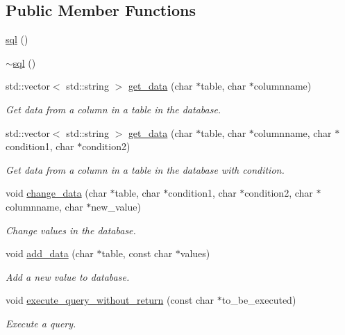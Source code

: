 \subsection*{Public Member Functions}
\begin{DoxyCompactItemize}
\item 
\hyperlink{classsql_ac9b186df2a51d7eda72cd4a9c34c0624}{sql} ()
\item 
\hyperlink{classsql_a67805540e55f3cfb1849178023aa39b2}{$\sim$sql} ()
\item 
std\+::vector$<$ std\+::string $>$ \hyperlink{classsql_a1cb74ab7343ef603490518715297be83}{get\+\_\+data} (char $\ast$table, char $\ast$columnname)
\begin{DoxyCompactList}\small\item\em Get data from a column in a table in the database. \end{DoxyCompactList}\item 
std\+::vector$<$ std\+::string $>$ \hyperlink{classsql_afbf7d36239ee07a23d06c72f2fd1b93c}{get\+\_\+data} (char $\ast$table, char $\ast$columnname, char $\ast$condition1, char $\ast$condition2)
\begin{DoxyCompactList}\small\item\em Get data from a column in a table in the database with condition. \end{DoxyCompactList}\item 
void \hyperlink{classsql_aa6a8501373e0cd73d48bee389353d6ea}{change\+\_\+data} (char $\ast$table, char $\ast$condition1, char $\ast$condition2, char $\ast$columnname, char $\ast$new\+\_\+value)
\begin{DoxyCompactList}\small\item\em Change values in the database. \end{DoxyCompactList}\item 
void \hyperlink{classsql_a94c4df2d61461e99d3767f1b37163c2f}{add\+\_\+data} (char $\ast$table, const char $\ast$values)
\begin{DoxyCompactList}\small\item\em Add a new value to database. \end{DoxyCompactList}\item 
void \hyperlink{classsql_ac70e1da6d9e49f114bcf639fd1e6f86c}{execute\+\_\+query\+\_\+without\+\_\+return} (const char $\ast$to\+\_\+be\+\_\+executed)
\begin{DoxyCompactList}\small\item\em Execute a query. \end{DoxyCompactList}\item 

\end{DoxyCompactItemize}
